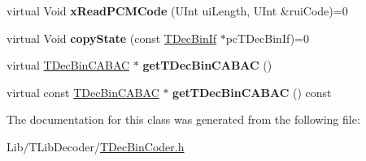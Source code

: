 \begin{DoxyCompactItemize}
virtual Void {\bfseries x\+Read\+P\+C\+M\+Code} (U\+Int ui\+Length, U\+Int \&rui\+Code)=0
\item 
\mbox{\label{class_t_dec_bin_if_ab6a7c23cdcfb2f35fe26e3858f32ebf6}} 
virtual Void {\bfseries copy\+State} (const \hyperlink{class_t_dec_bin_if}{T\+Dec\+Bin\+If} $\ast$pc\+T\+Dec\+Bin\+If)=0
\item 
\mbox{\label{class_t_dec_bin_if_a42d60fe4ea53aa62b6a2ff3632f0c534}} 
virtual \hyperlink{class_t_dec_bin_c_a_b_a_c}{T\+Dec\+Bin\+C\+A\+B\+AC} $\ast$ {\bfseries get\+T\+Dec\+Bin\+C\+A\+B\+AC} ()
\item 
\mbox{\label{class_t_dec_bin_if_abc81a98d60c0a1c0ce521f6d5680c102}} 
virtual const \hyperlink{class_t_dec_bin_c_a_b_a_c}{T\+Dec\+Bin\+C\+A\+B\+AC} $\ast$ {\bfseries get\+T\+Dec\+Bin\+C\+A\+B\+AC} () const
\end{DoxyCompactItemize}


The documentation for this class was generated from the following file\+:\begin{DoxyCompactItemize}
\item 
Lib/\+T\+Lib\+Decoder/\hyperlink{_t_dec_bin_coder_8h}{T\+Dec\+Bin\+Coder.\+h}\end{DoxyCompactItemize}
